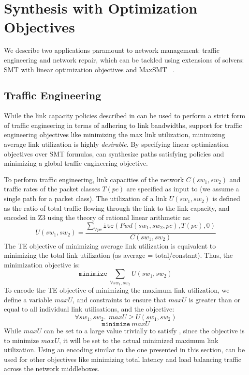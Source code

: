 \section{Synthesis with Optimization Objectives}
We describe two applications paramount to network management:
traffic engineering and network repair, which can be tackled using
extensions of solvers: SMT with linear optimization objectives and MaxSMT ~\cite{}.
\subsection{Traffic Engineering}
While the link capacity policies described in  can
be used to perform a strict form of traffic engineering in terms of 
adhering to link bandwidths, support for traffic engineering objectives
like minimizing the max link utilization, minimizing average link utilization
is highly \emph{desirable}. By specifying linear optimization objectives over
SMT formulas, \name can synthesize paths satisfying policies and minimizing
a global traffic engineering objective. 

To perform traffic engineering, link capacities of the network $C(sw_1, sw_2)$ and traffic 
rates of the packet classes $T(pc)$ are specified as input to \name (we assume a single
path for a packet class). The utilization 
of a link $U(sw_1, sw_2)$ is defined as the ratio of total traffic flowing through the link to the 
link capacity, and encoded in Z3 using the theory of rational linear arithmetic as:
\begin{equation}
U(sw_1, sw_2) = \frac{\sum_{\forall pc} \texttt{ite}(Fwd(sw_1,sw_2, pc), T(pc), 0)} {C(sw_1, sw_2)}
\end{equation}
The TE objective of minimizing average link utilization is equivalent to minimizing
the total link utilization (as average = total/constant). Thus, the minimization
objective is:
\begin{equation}
	\texttt{minimize}\ \sum_{\forall sw_1, sw_2} U(sw_1, sw_2)
\end{equation}
To encode the TE objective of minimizing the maximum link utilization, we define
a variable $maxU$, and constraints to ensure that $maxU$ is greater than or equal to all 
individual link utilisations, and the objective: 
\begin{equation} \label{eq:maxu}
\forall sw_1, sw_2.\ \ maxU \geq U(sw_1, sw_2)
\end{equation} 
\begin{equation}
		\texttt{minimize}\ maxU
\end{equation}
While $maxU$ can be set to a large value trivially to satisfy 
, since the objective is to minimize $maxU$, it will be set to the actual
minimized maximum link utilization. Using an encoding similar to the one presented in this section, \name can be used for other objectives like minimizing total latency and load balancing
traffic across the network middleboxes.

